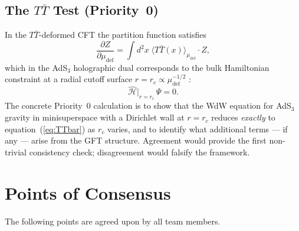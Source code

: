 \documentclass[11pt,a4paper]{article}
\begin{document}
\subsection{The \texorpdfstring{$T\bar{T}$}{TT-bar} Test (Priority~0)}
\label{sec:TTbar}

In the $T\bar{T}$-deformed CFT the partition function satisfies
\begin{equation}
  \frac{\partial Z}{\partial\mu_{\mathrm{def}}}
  = \int d^{2}x\;\langle T\bar{T}(x)\rangle_{\mu_{\mathrm{def}}}\cdot Z,
  \label{eq:TTbar}
\end{equation}
which in the AdS$_{3}$ holographic dual corresponds to the bulk Hamiltonian constraint at a
radial cutoff surface $r=r_{c}\propto\mu_{\mathrm{def}}^{-1/2}$ \cite{witten1998}:
\begin{equation}
  \hat{\mathcal{H}}\big|_{r=r_{c}}\,\Psi = 0.
  \label{eq:WdW_cutoff}
\end{equation}
The concrete Priority~0 calculation is to show that the WdW equation for AdS$_{3}$ gravity
in minisuperspace with a Dirichlet wall at $r=r_{c}$ reduces \emph{exactly} to
equation~(\ref{eq:TTbar}) as $r_{c}$ varies, and to identify what additional terms --- if
any --- arise from the GFT structure.  Agreement would provide the first non-trivial
consistency check; disagreement would falsify the framework.

\section{Points of Consensus}
\label{sec:consensus}

The following points are agreed upon by all team members.
\end{document}
